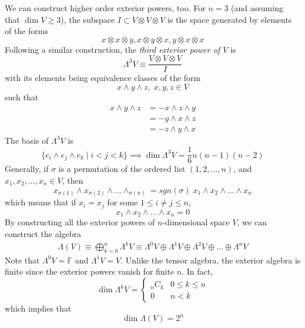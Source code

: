 \documentclass{article}
\theoremstyle{remark}
\theoremstyle{definition}
\begin{document}
We can construct higher order exterior powers, too. For $n = 3$ (and assuming that $\dim{V} \geq 3$), the subspace $I \subset V \otimes V \otimes V$ is the space generated by elements of the forms
\[x \otimes x \otimes y, x \otimes y \otimes x, y \otimes x \otimes x\]
Following a similar construction, the \textit{third exterior power of $V$} is
\[\Lambda^3 V \equiv \frac{V \otimes V \otimes V}{I}\]
with its elements being equivalence classes of the form
\[x \wedge y \wedge z,\; x, y, z \in V\]
such that
\begin{align*}
    x \wedge y \wedge z & = - x \wedge z \wedge y \\
    & = - y \wedge x \wedge z \\
    & = - z \wedge y \wedge x
\end{align*}
The basis of $\Lambda^3 V$ is
\[\{e_i \wedge e_j \wedge e_k \; | \; i < j < k\} \implies \dim{\Lambda^3 V} = \frac{1}{6} n (n-1) (n-2)\]
Generally, if $\sigma$ is a permutation of the ordered list $(1, 2, ..., n)$, and $x_1, x_2, ..., x_n \in V$, then 
\[x_{\sigma(1)} \wedge x_{\sigma(2)} \wedge ... \wedge_{\sigma(n)} = sgn(\sigma) \; x_1 \wedge x_2 \wedge ... \wedge x_n\]
which means that if $x_i = x_j$ for some $1 \leq i \neq j \leq n$, 
\[x_1 \wedge x_2 \wedge ... \wedge x_n = 0\]
By constructing all the exterior powers of $n$-dimensional space $V$, we can construct the algebra 
\begin{align*}
    \Lambda(V) \equiv \bigoplus_{k=0}^n \Lambda^k V \equiv \Lambda^0 V \oplus \Lambda^1 V \oplus \Lambda^2 V \oplus ... \oplus \Lambda^n V 
\end{align*}
Note that $\Lambda^0 V = \mathbb{F}$ and $\Lambda^1 V = V$. Unlike the tensor algebra, the exterior algebra is finite since the exterior powers vanish for finite $n$. In fact, 
\[ \dim{\Lambda^k V} = \begin{cases}
_n C_k & 0 \leq k \leq n \\
0 & n < k
\end{cases}\]
which implies that 
\[\dim{\Lambda(V)} = 2^n \]
\end{document}
